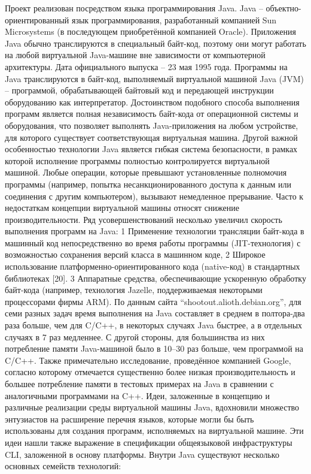Проект реализован посредством языка программирования Java. Java – объектно-ориентированный язык программирования, разработанный компанией Sun Microsystems (в последующем приобретённой компанией Oracle). Приложения Java обычно транслируются в специальный байт-код, поэтому они могут работать на любой виртуальной Java-машине вне зависимости от компьютерной архитектуры. Дата официального выпуска – 23 мая 1995 года.
Программы на Java транслируются в байт-код, выполняемый виртуальной машиной Java (JVM) – программой, обрабатывающей байтовый код и передающей инструкции оборудованию как интерпретатор.
Достоинством подобного способа выполнения программ является полная независимость байт-кода от операционной системы и оборудования, что позволяет выполнять Java-приложения на любом устройстве, для которого существует соответствующая виртуальная машина. Другой важной особенностью технологии Java является гибкая система безопасности, в рамках которой исполнение программы полностью контролируется виртуальной машиной. Любые операции, которые превышают установленные полномочия программы (например, попытка несанкционированного доступа к данным или соединения с другим компьютером), вызывают немедленное прерывание.
Часто к недостаткам концепции виртуальной машины относят снижение производительности. Ряд усовершенствований несколько увеличил скорость выполнения программ на Java:
1 Применение технологии трансляции байт-кода в машинный код непосредственно во время работы программы (JIT-технология) с возможностью сохранения версий класса в машинном коде,
2 Широкое использование платформенно-ориентированного кода (native-код) в стандартных библиотеках [20].
3 Аппаратные средства, обеспечивающие ускоренную обработку байт-кода (например, технология Jazelle, поддерживаемая некоторыми процессорами фирмы ARM).
По данным сайта “shootout.alioth.debian.org”, для семи разных задач время выполнения на Java составляет в среднем в полтора-два раза больше, чем для C/C++, в некоторых случаях Java быстрее, а в отдельных случаях в 7 раз медленнее. С другой стороны, для большинства из них потребление памяти Java-машиной было в 10–30 раз больше, чем программой на C/C++. Также примечательно исследование, проведённое компанией Google, согласно которому отмечается существенно более низкая производительность и большее потребление памяти в тестовых примерах на Java в сравнении с аналогичными программами на C++.
Идеи, заложенные в концепцию и различные реализации среды виртуальной машины Java, вдохновили множество энтузиастов на расширение перечня языков, которые могли бы быть использованы для создания программ, исполняемых на виртуальной машине. Эти идеи нашли также выражение в спецификации общеязыковой инфраструктуры CLI, заложенной в основу платформы. Внутри Java существуют несколько основных семейств технологий:

